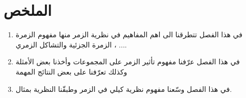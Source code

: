 \chapter*{الملخص}

\begin{enumerate}[itemindent=25pt]
	\item[\textbf{الفصل الأول:}] في هذا الفصل تتطرقنا الى اهم المفاهيم في نظرية الزمر منها مفهوم الزمرة الزمرة الجزئية والتشاكل الزمري ، ....\\
	\item[\textbf{الفصل الثاني:}] في هذا الفصل عرّفنا مفهوم تأثير الزمر على المجموعات وأخذنا بعض الأمثلة وكذلك تعرّفنا على بعض النتائج المهمة\\
	\item[\textbf{الفصل الثالث:}] في هذا الفصل وسّعنا مفهوم نظرية كيلي في الزمر وطبقّنا النظرية بمثال.
\end{enumerate}